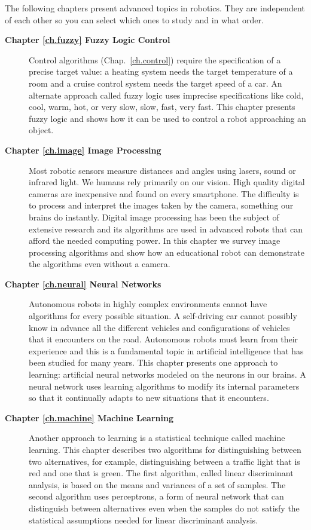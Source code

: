 The following chapters present advanced topics in robotics. They are independent of each other so you can select which ones to study and in what order.
\begin{description}
\item [\textbf{Chapter \ref{ch.fuzzy} Fuzzy Logic Control}] Control algorithms (Chap.~\ref{ch.control}) require the specification of a precise target value: a heating system needs the target temperature of a room and a cruise control system needs the target speed of a car. An alternate approach called fuzzy logic uses imprecise specifications like cold, cool, warm, hot, or very slow, slow, fast, very fast. This chapter presents fuzzy logic and shows how it can be used to control a robot approaching an object.
\smallskip
\item [\textbf{Chapter \ref{ch.image} Image Processing}] Most robotic sensors measure distances and angles using lasers, sound or infrared light. We humans rely primarily on our vision. High quality digital cameras are inexpensive and found on every smartphone. The difficulty is to process and interpret the images taken by the camera, something our brains do instantly. Digital image processing has been the subject of extensive research and its algorithms are used in advanced robots that can afford the needed computing power. In this chapter we survey image processing algorithms and show how an educational robot can demonstrate the algorithms even without a camera.
\smallskip
\item [\textbf{Chapter \ref{ch.neural} Neural Networks}] Autonomous robots in highly complex environments cannot have algorithms for every possible situation. A self-driving car cannot possibly know in advance all the different vehicles and configurations of vehicles that it encounters on the road. Autonomous robots must learn from their experience and this is a fundamental topic in artificial intelligence that has been studied for many years. This chapter presents one approach to learning: artificial neural networks modeled on the neurons in our brains. A neural network uses learning algorithms to modify its internal parameters so that it continually adapts to new situations that it encounters.
\smallskip
\item [\textbf{Chapter \ref{ch.machine} Machine Learning}] Another approach to learning is a statistical technique called machine learning. This chapter describes two algorithms for distinguishing between two alternatives, for example, distinguishing between a traffic light that is red and one that is green. The first algorithm, called linear discriminant analysis, is based on the means and variances of a set of samples. The second algorithm uses perceptrons, a form of neural network that can distinguish between alternatives even when the samples do not satisfy the statistical assumptions needed for linear discriminant analysis.

\end{description}
